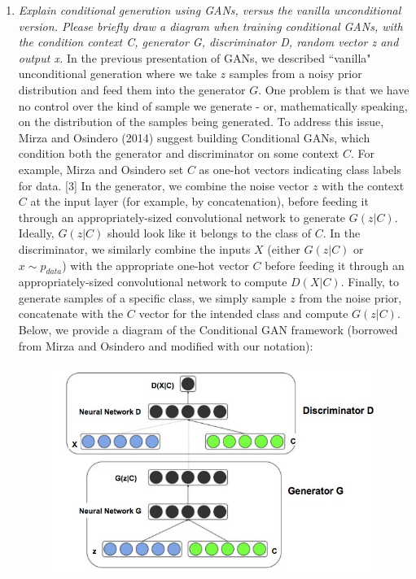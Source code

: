 \documentclass[a4paper]{article}
\begin{document}
\begin{enumerate}
{}
\item{\textit{Explain conditional generation using GANs, versus the vanilla unconditional version. Please briefly draw a diagram when training conditional GANs, with the condition context C, generator G, discriminator D, random vector z and output x.}
\newline
\newline
In the previous presentation of GANs, we described ``vanilla" unconditional generation where we take $z$ samples from a noisy prior distribution and feed them into the generator $G$. One problem is that we have no control over the kind of sample we generate - or, mathematically speaking, on the distribution of the samples being generated. 
\newline
\newline
To address this issue, Mirza and Osindero (2014) suggest building Conditional GANs, which condition both the generator and discriminator on some context $C$. For example, Mirza and Osindero set $C$ as one-hot vectors indicating class labels for data. [3]
\newline
\newline
In the generator, we combine the noise vector $z$ with the context $C$ at the input layer (for example, by concatenation), before feeding it through an appropriately-sized convolutional network to generate $G(z|C)$. Ideally, $G(z|C)$ should look like it belongs to the class of $C$. In the discriminator, we similarly combine the inputs $X$ (either $G(z|C)$ or $x \sim p_{data}$) with the appropriate one-hot vector $C$ before feeding it through an appropriately-sized convolutional network to compute $D(X|C)$. Finally, to generate samples of a specific class, we simply sample $z$ from the noise prior, concatenate with the $C$ vector for the intended class and compute $G(z|C)$. 
\newline
\newline
Below, we provide a diagram of the Conditional GAN framework (borrowed from Mirza and Osindero and modified with our notation):
\begin{figure}[H]
  \includegraphics[scale=3]{images/my_conditional_gan.jpg}
  \label{fig:boat1}
\end{figure}

}
\end{enumerate}
\end{document}
